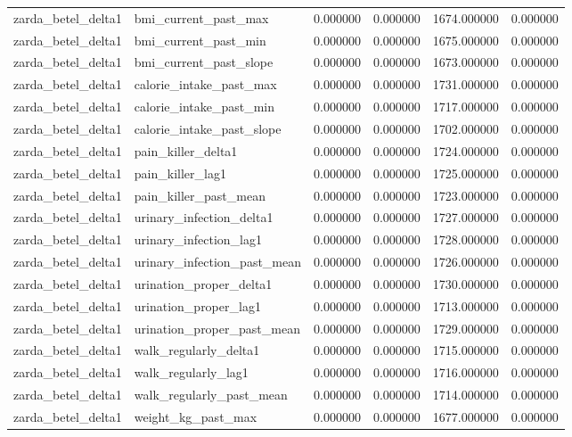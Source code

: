 \begin{longtable}{llrrrr}
zarda\_betel\_delta1 & bmi\_current\_past\_max & 0.000000 & 0.000000 & 1674.000000 & 0.000000 \\
zarda\_betel\_delta1 & bmi\_current\_past\_min & 0.000000 & 0.000000 & 1675.000000 & 0.000000 \\
zarda\_betel\_delta1 & bmi\_current\_past\_slope & 0.000000 & 0.000000 & 1673.000000 & 0.000000 \\
zarda\_betel\_delta1 & calorie\_intake\_past\_max & 0.000000 & 0.000000 & 1731.000000 & 0.000000 \\
zarda\_betel\_delta1 & calorie\_intake\_past\_min & 0.000000 & 0.000000 & 1717.000000 & 0.000000 \\
zarda\_betel\_delta1 & calorie\_intake\_past\_slope & 0.000000 & 0.000000 & 1702.000000 & 0.000000 \\
zarda\_betel\_delta1 & pain\_killer\_delta1 & 0.000000 & 0.000000 & 1724.000000 & 0.000000 \\
zarda\_betel\_delta1 & pain\_killer\_lag1 & 0.000000 & 0.000000 & 1725.000000 & 0.000000 \\
zarda\_betel\_delta1 & pain\_killer\_past\_mean & 0.000000 & 0.000000 & 1723.000000 & 0.000000 \\
zarda\_betel\_delta1 & urinary\_infection\_delta1 & 0.000000 & 0.000000 & 1727.000000 & 0.000000 \\
zarda\_betel\_delta1 & urinary\_infection\_lag1 & 0.000000 & 0.000000 & 1728.000000 & 0.000000 \\
zarda\_betel\_delta1 & urinary\_infection\_past\_mean & 0.000000 & 0.000000 & 1726.000000 & 0.000000 \\
zarda\_betel\_delta1 & urination\_proper\_delta1 & 0.000000 & 0.000000 & 1730.000000 & 0.000000 \\
zarda\_betel\_delta1 & urination\_proper\_lag1 & 0.000000 & 0.000000 & 1713.000000 & 0.000000 \\
zarda\_betel\_delta1 & urination\_proper\_past\_mean & 0.000000 & 0.000000 & 1729.000000 & 0.000000 \\
zarda\_betel\_delta1 & walk\_regularly\_delta1 & 0.000000 & 0.000000 & 1715.000000 & 0.000000 \\
zarda\_betel\_delta1 & walk\_regularly\_lag1 & 0.000000 & 0.000000 & 1716.000000 & 0.000000 \\
zarda\_betel\_delta1 & walk\_regularly\_past\_mean & 0.000000 & 0.000000 & 1714.000000 & 0.000000 \\
zarda\_betel\_delta1 & weight\_kg\_past\_max & 0.000000 & 0.000000 & 1677.000000 & 0.000000 \\

\end{longtable}
